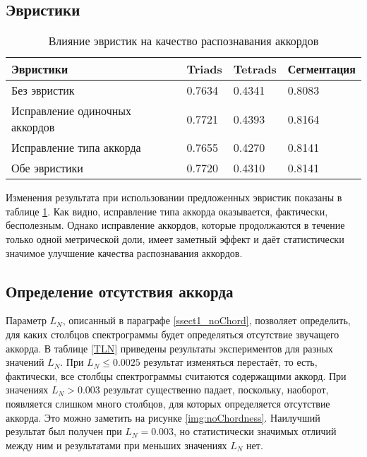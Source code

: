 \subsection{Эвристики} \label{ssect3_heuristics}

\begin{table} [htbp]
  \centering
  \parbox{15cm}{\caption{Влияние эвристик на качество распознавания аккордов}
  \label{THeuristics}}
  \begin{tabular}{|l|l|l|l|}
  \hline
  Эвристики & Triads & Tetrads & Сегментация \\
  \hline
  Без эвристик & 0.7634 & 0.4341 & 0.8083 \\
  Исправление одиночных аккордов & 0.7721 & 0.4393 & 0.8164 \\
  Исправление типа аккорда & 0.7655 & 0.4270 & 0.8141 \\
  Обе эвристики & 0.7720 & 0.4310 & 0.8141 \\
  \hline
  \end{tabular}
\end{table}

Изменения результата при использовании предложенных эвристик показаны в таблице
\ref{THeuristics}. Как видно, исправление типа аккорда оказывается, фактически,
бесполезным. Однако исправление аккордов, которые продолжаются в течение только
одной метрической доли, имеет заметный эффект и даёт статистически значимое
улучшение качества распознавания аккордов.

\subsection{Определение отсутствия аккорда} \label{ssect3_noChord}

Параметр $L_N$, описанный в параграфе \ref{ssect1_noChord}, позволяет
определить, для каких столбцов спектрограммы будет определяться отсутствие
звучащего аккорда. В таблице \ref{TLN} приведены результаты экспериментов для
разных значений $L_N$. При $L_N \leq 0.0025$ результат изменяться перестаёт, то
есть, фактически, все столбцы спектрограммы считаются содержащими аккорд. При
значениях $L_N > 0.003$ результат существенно падает, поскольку, наоборот,
появляется слишком много столбцов, для которых определяется отсутствие аккорда.
Это можно заметить на рисунке \ref{img:noChordness}. Наилучший результат был
получен при $L_N = 0.003$, но статистически значимых отличий между ним и
результатами при меньших значениях $L_N$ нет.

